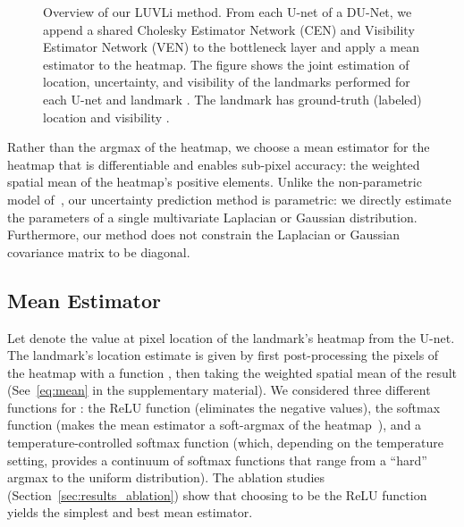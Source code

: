 \documentclass[10pt,twocolumn,letterpaper]{article}
\newcommand{\1}{{\bf 1}}
\newcommand{\0}{{\bf 0}}
\begin{document}
\begin{figure}[!tb]
\begin{tikzpicture}[scale=.4, every node/.style={scale=0.7}, every edge/.style={scale=0.7}]
\end{tikzpicture}
         \vspace{-0.4cm}
        \caption{Overview of our LUVLi method. From each U-net of a DU-Net, we append a shared Cholesky Estimator Network (CEN) and Visibility Estimator Network (VEN) to the bottleneck layer and apply a mean estimator to the heatmap. The figure shows the joint estimation of location, uncertainty, and visibility of the landmarks performed for each U-net  and landmark . The landmark has ground-truth (labeled) location  and visibility .}
        \label{fig:overview}
        \vspace{-0.3cm}
    \end{figure}
    
    Rather than the argmax of the heatmap, we choose a mean estimator for the heatmap that is differentiable and enables sub-pixel accuracy: the weighted spatial mean of the heatmap's positive elements. Unlike the non-parametric model of~\cite{kdnuncertain, chen2019face}, our uncertainty prediction method is parametric: we directly estimate the parameters of a single multivariate Laplacian or Gaussian distribution. Furthermore, our method does not constrain the Laplacian or Gaussian covariance matrix to be diagonal.


\subsection{Mean Estimator}\label{sec:soft-argmax}
    \vspace{-0.15cm}
    Let  denote the value at pixel location  of the  landmark's heatmap from the  U-net. 
    The landmark's location estimate  is given by first post-processing the pixels of the heatmap  with a function , then taking the weighted spatial mean of the result (See~\eqref{eq:mean} in the supplementary material). We considered three different functions for : the ReLU function (eliminates the negative values), the softmax function (makes the mean estimator a soft-argmax of the heatmap~\cite{chapelle2010gradient, yi2016lift, luvizon20182d, dong2018supervision}), and a temperature-controlled softmax function (which, depending on the temperature setting, provides a continuum of softmax functions that range from a ``hard'' argmax to the uniform distribution). The ablation studies (Section~\ref{sec:results_ablation}) show that choosing  to be the ReLU function yields the simplest and best mean estimator.    
\end{document}
